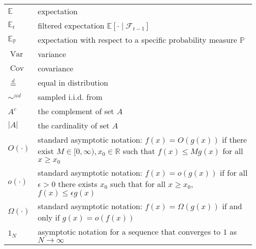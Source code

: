 \documentclass[oneside]{scrbook} %
\newcommand{\seb}[1]{\xspace\textcolor{red}{#1}\xspace} %
\theoremstyle{definition}
\newcommand{\E}{\mathbb{E}}
\newcommand{\Et}{\mathbb{E}_t}
\newcommand{\V}{\operatorname{Var}}
\newcommand{\Cov}{\operatorname{Cov}}
\newcommand{\ON}{1_N}
\newcommand{\eqdist}{\overset{d}{=}}
\newcommand{\simiid}{\sim^{iid}}%
\newcommand{\1}[1]{\mathbbm{1}_{#1}} %
\begin{document}
\begin{longtable}{p{} p{}}
$\E$ & expectation \\
$\Et$ & filtered expectation $\E[ \cdot \mid \mathcal{F}_{t-1}]$\\
$\E_\mathbb{P}$ & expectation with respect to a specific probability measure $\mathbb{P}$ \\
$\V$ & variance \\
$\Cov$ & covariance \\
$\eqdist$ & equal in distribution \\
$\simiid$ & sampled i.i.d. from \\
$A^c$ & the complement of set $A$\\
$|A|$ & the cardinality of set $A$\\
$O(\cdot)$ & standard asymptotic notation: $f(x) = O(g(x))$ if there exist $M\in[0,\infty), x_0 \in \mathbb{R}$ such that $f(x) \leq Mg(x)$ for all $x\geq x_0$ \\
$o(\cdot)$ & standard asymptotic notation: $f(x) = o(g(x))$ if for all $\epsilon>0$ there exists $x_0$ such that for all $x\geq x_0$, $f(x) \leq \epsilon g(x)$ \\
$\Omega(\cdot)$ & standard asymptotic notation: $f(x) = \Omega(g(x))$ if and only if $g(x) = o(f(x))$ \\
$\ON$ & asymptotic notation for a sequence that converges to $1$ as $N\to\infty$ \\
\end{longtable}


\mainmatter











\backmatter


\printbibliography
\end{document}
